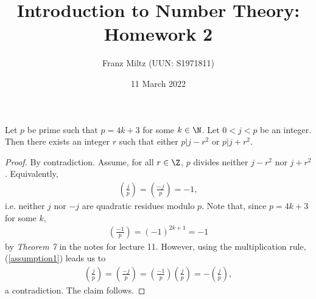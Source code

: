 \documentclass{article}
\begin{document}
\title{Introduction to Number Theory: Homework 2}
\author{Franz Miltz (UUN: S1971811)}
\date{11 March 2022}
\maketitle

\begin{claim*}[1]
	Let $p$ be prime such that $p=4k+3$ for some $k\in\N$. Let $0<j<p$ be an integer. Then
	there exists an integer $r$ such that either $p|j-r^2$ or $p|j+r^2$.
	\begin{proof}
		By contradiction. Assume, for all $r\in\Z$, $p$ divides neither $j-r^2$ nor $j+r^2$.
		Equivalently,
		\begin{align}
			\label{assumption1}
			\left(\frac{j}{p}\right)=\left(\frac{-j}{p}\right)=-1,
		\end{align}
		i.e. neither $j$ nor $-j$ are quadratic residues modulo $p$. Note that, since $p=4k+3$
		for some $k$,
		\begin{align}
			\label{minus_one}
			\left(\frac{-1}{p}\right)=(-1)^{2k+1}=-1
		\end{align}
		by \emph{Theorem 7} in the notes for lecture 11. However, using the multiplication rule,
		(\ref{assumption1}) leads us to
		\begin{align*}
			\left(\frac{j}{p}\right) = \left(\frac{-j}{p}\right)
			= \left(\frac{-1}{p}\right)\left(\frac{j}{p}\right)
			= -\left(\frac{j}{p}\right),
		\end{align*}
		a contradiction. The claim follows.
	\end{proof}
\end{claim*}
\end{document}
